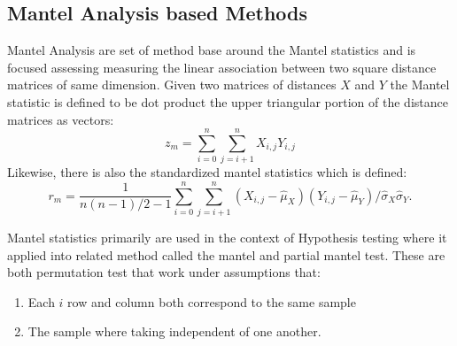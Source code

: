 \subsection*{Mantel Analysis based Methods}
    Mantel Analysis  are set of method base around the
    Mantel statistics and is focused assessing measuring the linear association between two square distance matrices
        of same dimension.
    Given two matrices of distances $X$ and $Y$ the Mantel statistic is defined to be dot product the upper triangular
    portion of the distance matrices as vectors:
    \[z_{m} =  \sum_{i=0}^{n} \sum_{j=i+1}^{n} X_{i,j}Y_{i,j}\]
    Likewise, there is also the standardized mantel statistics which is defined:
    \[r_{m} =   \frac{1}{n(n-1)/2-1} \sum_{i=0}^{n} \sum_{j=i+1}^{n}
                (X_{i,j}-\hat{\mu}_X)(Y_{i,j}-\hat{\mu}_Y)/\hat{\sigma}_X\hat{\sigma}_Y.
    \]

    Mantel statistics primarily are used in the context of Hypothesis testing where it applied into
        related method called the mantel and partial mantel test.
    These are both permutation test that work under assumptions that:
    \begin{enumerate}
        \item   Each $i$ row and column both correspond to the same sample
        \item   The sample where taking independent of one another.
    \end{enumerate} %

